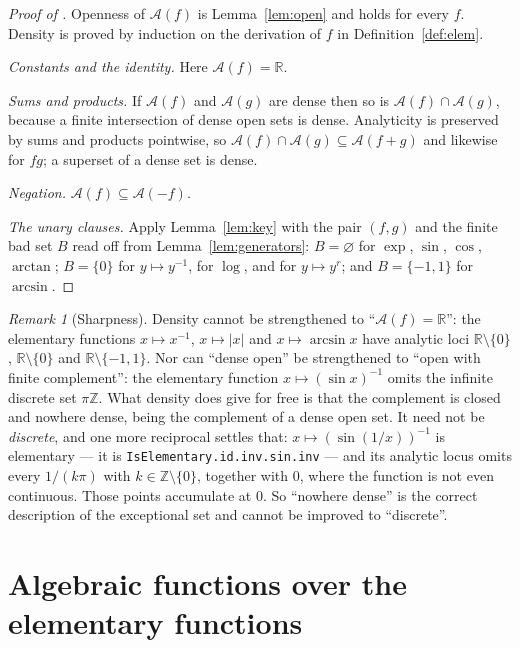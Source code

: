 \documentclass[11pt,oneside]{article}
\theoremstyle{definition}
\theoremstyle{remark}
\newtheorem{remark}[theorem]{Remark}
\newcommand{\R}{\mathbb R}
\newcommand{\Z}{\mathbb Z}
\newcommand{\An}{\mathcal A}
\begin{document}
\begin{proof}[Proof of ]
Openness of $\An(f)$ is Lemma~\ref{lem:open} and holds for every $f$.  Density is
proved by induction on the derivation of $f$ in Definition~\ref{def:elem}.

\emph{Constants and the identity.}  Here $\An(f)=\R$.

\emph{Sums and products.}  If $\An(f)$ and $\An(g)$ are dense then so is
$\An(f)\cap\An(g)$, because a finite intersection of dense open sets is dense.
Analyticity is preserved by sums and products pointwise, so
$\An(f)\cap\An(g)\subseteq\An(f+g)$ and likewise for $fg$; a superset of a
dense set is dense.

\emph{Negation.}  $\An(f)\subseteq\An(-f)$.

\emph{The unary clauses.}  Apply Lemma~\ref{lem:key} with the pair $(f,g)$ and the
finite bad set $B$ read off from Lemma~\ref{lem:generators}: $B=\varnothing$ for
$\exp$, $\sin$, $\cos$, $\arctan$; $B=\{0\}$ for $y\mapsto y^{-1}$, for
$\log$, and for $y\mapsto y^{r}$; and $B=\{-1,1\}$ for $\arcsin$.
\end{proof}

\begin{remark}[Sharpness]
Density cannot be strengthened to ``$\An(f)=\R$'': the elementary functions
$x\mapsto x^{-1}$, $x\mapsto|x|$ and $x\mapsto\arcsin x$ have analytic loci
$\R\setminus\{0\}$, $\R\setminus\{0\}$ and $\R\setminus\{-1,1\}$.  Nor can
``dense open'' be strengthened to ``open with finite complement'': the
elementary function $x\mapsto (\sin x)^{-1}$ omits the infinite discrete set
$\pi\Z$.  What density does give for free is that the complement is closed
and nowhere dense, being the complement of a dense open set.  It need not be
\emph{discrete}, and one more reciprocal settles that: $x\mapsto(\sin(1/x))^{-1}$
is elementary --- it is \texttt{IsElementary.id.inv.sin.inv} --- and its
analytic locus omits every $1/(k\pi)$ with $k\in\Z\setminus\{0\}$, together
with $0$, where the function is not even continuous.  Those points accumulate
at $0$.  So ``nowhere dense'' is the correct description of the exceptional
set and cannot be improved to ``discrete''.
\end{remark}

\section{Algebraic functions over the elementary functions}\label{sec:algebraic}
\end{document}
